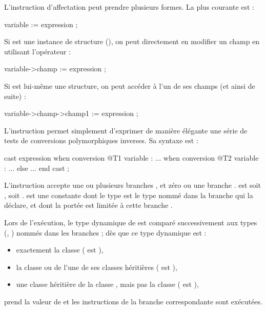 
L'instruction d'affectation peut prendre plusieurs formes. La plus courante est :
\begin{galgascode}
variable := expression ;
\end{galgascode}

Si  est une instance de structure (), on peut directement en modifier un champ en utilisant l'opérateur \galgas{->} :
\begin{galgascode}
variable->champ := expression ;
\end{galgascode}

Si  est lui-même une structure, on peut accéder à l'un de ses champs (et ainsi de suite) :
\begin{galgascode}
variable->champ->champ1 := expression ;
\end{galgascode}





L'instruction  permet simplement d'exprimer de manière élégante une série de tests de conversions polymorphiques inverses. Sa syntaxe est :

\begin{galgascode}
cast expression
when conversion @T1 variable :
  ...
when conversion @T2 variable :
  ...
else
  ...
end cast ;
\end{galgascode}

L'instruction accepte une ou plusieurs branches , et zéro ou une branche .  est soit \galgas{==}, soit \galgas{>=}.  est une constante dont le type est le type nommé dans la branche  qui la déclare, et dont la portée est limitée à cette branche .

Lors de l'exécution, le type dynamique de  est comparé successivement aux types (, ) nommés dans les branches  ; dès que ce type dynamique est :
\begin{itemize}
  \item exactement la classe  ( est \galgas{==}), 
  \item la classe  ou de l'une de ses classes héritières ( est \galgas{>=}),
  \item une classe héritière de la classe , mais pas la classe  ( est \galgas{>}),
\end{itemize}
 prend la valeur de  et les instructions de la branche correspondante sont exécutées.

